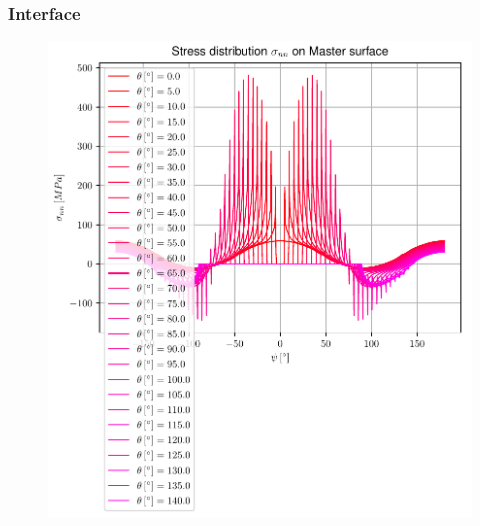\documentclass[first,firstsupp,lastsupp,handout,last,hyperref,table]{ETHclass}
\begin{document}
\begin{frame}
\frametitle{\vspace{0.35cm}\scriptsize Interface}
\vspace{-0.85cm}
\begin{figure}
\includegraphics[height=0.9\textheight]{2017-03-03_AbqRunSummary_AllNormalStressOnMaster.pdf}
\end{figure}
\end{frame}
\end{document}
